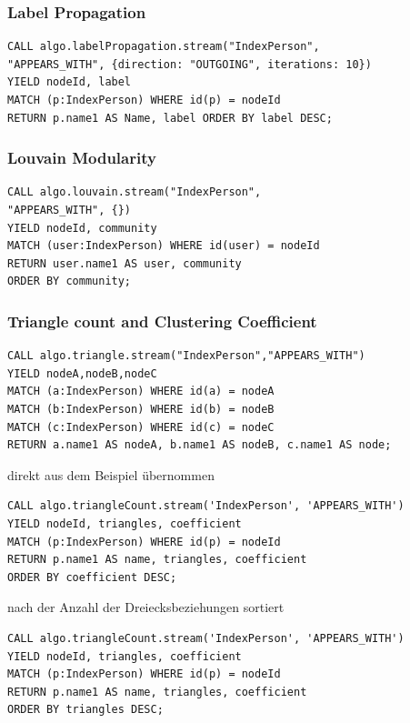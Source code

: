 \documentclass[12pt,ngerman,]{article}
\begin{document}
\subsubsection{Label Propagation}\label{label-propagation}

\begin{verbatim}
CALL algo.labelPropagation.stream("IndexPerson",
"APPEARS_WITH", {direction: "OUTGOING", iterations: 10})
YIELD nodeId, label
MATCH (p:IndexPerson) WHERE id(p) = nodeId
RETURN p.name1 AS Name, label ORDER BY label DESC;
\end{verbatim}

\subsubsection{Louvain Modularity}\label{louvain-modularity}

\begin{verbatim}
CALL algo.louvain.stream("IndexPerson",
"APPEARS_WITH", {})
YIELD nodeId, community
MATCH (user:IndexPerson) WHERE id(user) = nodeId
RETURN user.name1 AS user, community
ORDER BY community;
\end{verbatim}

\subsubsection{Triangle count and Clustering
Coefficient}\label{triangle-count-and-clustering-coefficient}

\begin{verbatim}
CALL algo.triangle.stream("IndexPerson","APPEARS_WITH")
YIELD nodeA,nodeB,nodeC
MATCH (a:IndexPerson) WHERE id(a) = nodeA
MATCH (b:IndexPerson) WHERE id(b) = nodeB
MATCH (c:IndexPerson) WHERE id(c) = nodeC
RETURN a.name1 AS nodeA, b.name1 AS nodeB, c.name1 AS node;
\end{verbatim}

direkt aus dem Beispiel übernommen

\begin{verbatim}
CALL algo.triangleCount.stream('IndexPerson', 'APPEARS_WITH')
YIELD nodeId, triangles, coefficient
MATCH (p:IndexPerson) WHERE id(p) = nodeId
RETURN p.name1 AS name, triangles, coefficient
ORDER BY coefficient DESC;
\end{verbatim}

nach der Anzahl der Dreiecksbeziehungen sortiert

\begin{verbatim}
CALL algo.triangleCount.stream('IndexPerson', 'APPEARS_WITH')
YIELD nodeId, triangles, coefficient
MATCH (p:IndexPerson) WHERE id(p) = nodeId
RETURN p.name1 AS name, triangles, coefficient
ORDER BY triangles DESC;
\end{verbatim}
\end{document}
